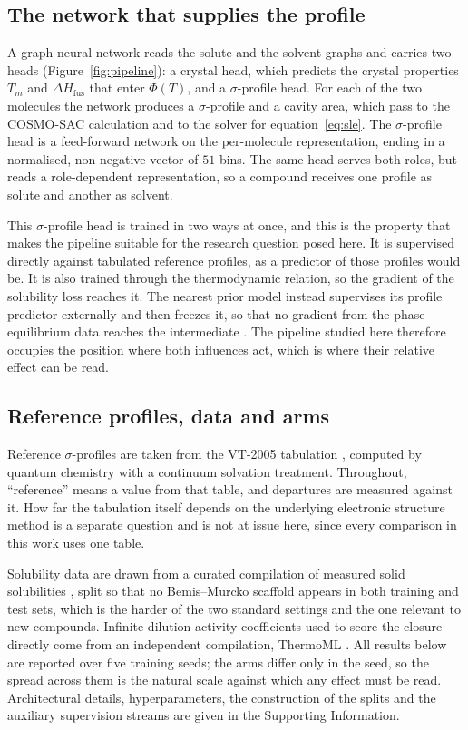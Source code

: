 \subsection{The network that supplies the profile}

A graph neural network reads the solute and the solvent graphs and carries two heads
(Figure~\ref{fig:pipeline}): a crystal head, which predicts the crystal properties $T_m$ and
$\Delta H_{\mathrm{fus}}$ that enter $\Phi(T)$, and a $\sigma$-profile head. For each of the two
molecules the network produces a $\sigma$-profile and a cavity area, which pass to the COSMO-SAC
calculation and to the solver for equation~\eqref{eq:sle}. The $\sigma$-profile head is a
feed-forward network on the per-molecule representation, ending in a normalised, non-negative
vector of $51$ bins. The same head serves both roles, but reads a role-dependent representation,
so a compound receives one profile as solute and another as solvent.

This $\sigma$-profile head is trained in two ways at once, and this is the property that makes the
pipeline suitable for the research question posed here. It is supervised directly against
tabulated reference profiles, as a predictor of those profiles would be. It is also trained
through the thermodynamic relation, so the gradient of the solubility loss reaches it. The nearest
prior model instead supervises its profile predictor externally and then freezes it, so that no
gradient from the phase-equilibrium data reaches the intermediate \cite{yang2025tennet}. The
pipeline studied here therefore occupies the position where both influences act, which is where
their relative effect can be read.

\subsection{Reference profiles, data and arms}

Reference $\sigma$-profiles are taken from the VT-2005 tabulation \cite{mullins2006}, computed by
quantum chemistry with a continuum solvation treatment. Throughout, ``reference'' means a value
from that table, and departures are measured against it. How far the tabulation itself depends on
the underlying electronic structure method is a separate question \cite{salih2025sigma} and is not
at issue here, since every comparison in this work uses one table.

Solubility data are drawn from a curated compilation of measured solid solubilities
\cite{krasnov2025bigsoldb}, split so that no Bemis--Murcko scaffold \cite{bemis1996} appears in both
training and test sets, which is the harder of the two standard settings and the one relevant to new compounds.
Infinite-dilution activity coefficients used to score the closure directly come from an independent
compilation, ThermoML \cite{frenkel2011thermoml}. All results below are reported over five training seeds; the arms differ only in the
seed, so the spread across them is the natural scale against which any effect must be read.
Architectural details, hyperparameters, the construction of the splits and the auxiliary
supervision streams are given in the Supporting Information.

